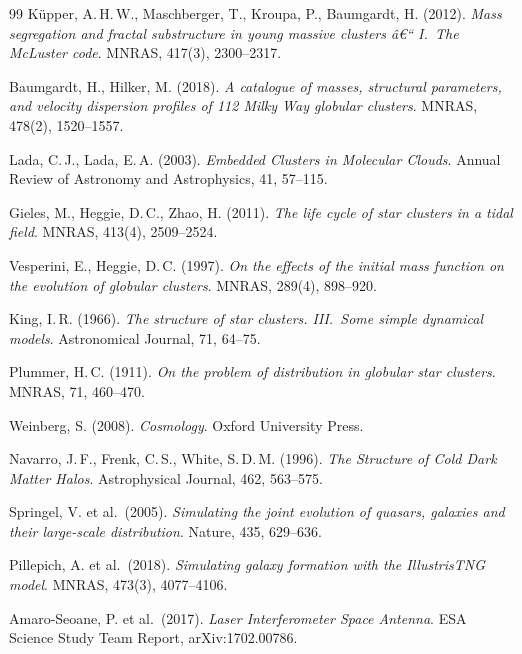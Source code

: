 ﻿\documentclass[a4paper,12pt]{report}
\theoremstyle{definition}
\begin{document}
\begin{thebibliography}{99}
Küpper, A.\,H.\,W., Maschberger, T., Kroupa, P., Baumgardt, H. (2012). \textit{Mass segregation and fractal substructure in young massive clusters â€“ I.\ The McLuster code}. MNRAS, 417(3), 2300--2317.

Baumgardt, H., Hilker, M. (2018). \textit{A catalogue of masses, structural parameters, and velocity dispersion profiles of 112 Milky Way globular clusters}. MNRAS, 478(2), 1520--1557.

Lada, C.\,J., Lada, E.\,A. (2003). \textit{Embedded Clusters in Molecular Clouds}. Annual Review of Astronomy and Astrophysics, 41, 57--115.

Gieles, M., Heggie, D.\,C., Zhao, H. (2011). \textit{The life cycle of star clusters in a tidal field}. MNRAS, 413(4), 2509--2524.

Vesperini, E., Heggie, D.\,C. (1997). \textit{On the effects of the initial mass function on the evolution of globular clusters}. MNRAS, 289(4), 898--920.

King, I.\,R. (1966). \textit{The structure of star clusters. III.\ Some simple dynamical models}. Astronomical Journal, 71, 64--75.

Plummer, H.\,C. (1911). \textit{On the problem of distribution in globular star clusters}. MNRAS, 71, 460--470.


Weinberg, S. (2008). \textit{Cosmology}. Oxford University Press.

Navarro, J.\,F., Frenk, C.\,S., White, S.\,D.\,M. (1996). \textit{The Structure of Cold Dark Matter Halos}. Astrophysical Journal, 462, 563--575.

Springel, V. et al.\ (2005). \textit{Simulating the joint evolution of quasars, galaxies and their large-scale distribution}. Nature, 435, 629--636.

Pillepich, A. et al.\ (2018). \textit{Simulating galaxy formation with the IllustrisTNG model}. MNRAS, 473(3), 4077--4106.


Amaro-Seoane, P. et al.\ (2017). \textit{Laser Interferometer Space Antenna}. ESA Science Study Team Report, arXiv:1702.00786.


\end{thebibliography}
\end{document}
